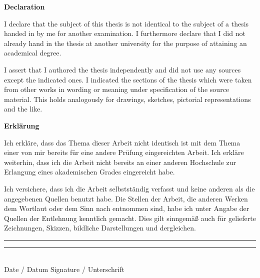 \documentclass[11pt, a4paper]{article}
\begin{document}
\newpage
\topskip 0pt

\vspace*{\fill}

\begin{center}
	\textbf{Declaration}
\end{center}
I declare that the subject of this thesis is not identical to the subject of a thesis handed in by me for another examination.
I furthermore declare that I did not already hand in the thesis at another university for the purpose of attaining an academical degree.

I assert that I authored the thesis independently and did not use any sources except the indicated ones. I indicated the sections of the thesis which were taken from other works in wording or meaning under specification of the source material. This holds analogously for drawings, sketches, pictorial representations and the like.

\vspace{2cm}

\begin{center}
	\textbf{Erklärung}
\end{center}
Ich erkläre, dass das Thema dieser Arbeit nicht identisch ist mit dem Thema einer von mir bereits für eine andere Prüfung eingereichten Arbeit.
Ich erkläre weiterhin, dass ich die Arbeit nicht bereits an einer anderen Hochschule zur Erlangung eines akademischen Grades eingereicht habe.

Ich versichere, dass ich die Arbeit selbstständig verfasst und keine anderen als die angegebenen Quellen benutzt habe. Die Stellen der Arbeit, die anderen Werken dem Wortlaut oder dem Sinn nach entnommen sind, habe ich unter Angabe der Quellen der Entlehnung kenntlich gemacht. Dies gilt sinngemäß auch für gelieferte Zeichnungen, Skizzen, bildliche Darstellungen und dergleichen.

\vspace{2cm}

\rule[0.05cm]{5cm}{0.5pt} \hspace{5cm} \rule[0.05cm]{5cm}{0.5pt}\\
Date / Datum \hspace{7.6cm} Signature / Unterschrift

\vspace*{\fill}
\end{document}
